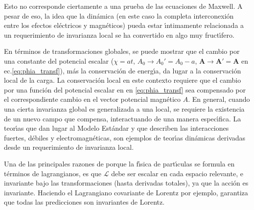 Esto no corresponde ciertamente a una prueba de las ecuaciones de Maxwell. A pesar de eso, la idea que la din\'amica (en este caso la completa interconexi\'on entre los efectos el\'ectricos y magn\'eticos) pueda estar \'\i ntimamente relacionada a un requerimiento de invarianza local se ha convertido en algo muy fruct\'\i fero. 

En t\'erminos de transformaciones globales, se puede mostrar \cite{Aitchison:2003tq} que el cambio por una constante del potencial escalar ($\chi=at$, $A_0\to A_0'=A_0-a$, $\mathbf{A}\to \mathbf{A}'=\mathbf{A}$ en ec.\eqref{eq:phia_transf}), m\'as la conservaci\'on de energ\'\i a, da lugar a la conservaci\'on local de la carga. La conservaci\'on local en este contexto requiere que el cambio por una funci\'on del potencial escalar en en \eqref{eq:phia_transf} sea compensado por el correspondiente cambio en el vector potencial magn\'etico $A$. En general, cuando una cierta invarianza global es generalizada a una local, se requiere la existencia de un nuevo campo que compensa, interactuando de una manera espec\'\i fica. La teor\'\i as que dan lugar al Modelo Est\'andar y que describen las interacciones fuertes, d\'ebiles y electromagn\'eticas, son ejemplos de teor\'\i as din\'amicas derivadas desde un requerimiento de invarianza local.

Una de las principales razones
de porque la f\'\i sica de part\'\i culas se formula en t\'erminos de
lagrangianos, es que $\mathcal{L}$ debe ser escalar en cada espacio
relevante, e invariante bajo las transformaciones (hasta derivadas
totales), ya que la acci\'on es invariante. Haciendo el Lagrangiano
covariante de Lorentz por ejemplo, garantiza que todas las
predicciones son invariantes de Lorentz.



